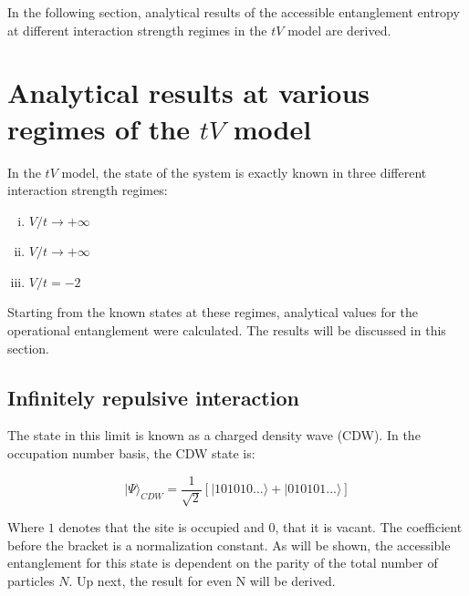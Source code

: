 In the following section, analytical results of the accessible entanglement entropy at different interaction strength regimes in the $tV$ model are derived.

\section{Analytical results at various regimes of the $tV$ model}
	In the $tV$ model, the state of the system is exactly known in three different interaction strength regimes:
	
	\begin{enumerate} [i)]
		
		\item$V/t \to +\infty $
		\item $V/t \to +\infty $
		\item $V/t = -2$
	\end{enumerate}
	
	Starting from the known states at these regimes, analytical values for the operational entanglement were calculated. The results will be discussed in this section.

	\subsection{Infinitely repulsive interaction}
		The state in this limit is known as a charged density wave (CDW). In the occupation number basis, the CDW state is:

\begin{equation}
| \Psi \rangle_{CDW} = \frac{1}{\sqrt{2}} [|101010... \rangle + |010101... \rangle ] 
\end{equation}

Where $1$ denotes that the site is occupied and $0$, that it is vacant. The coefficient before the bracket is a normalization constant. As will be shown, the accessible entanglement for this state is dependent on the parity of the total number of particles $N$. Up next, the result for even N will be derived.

